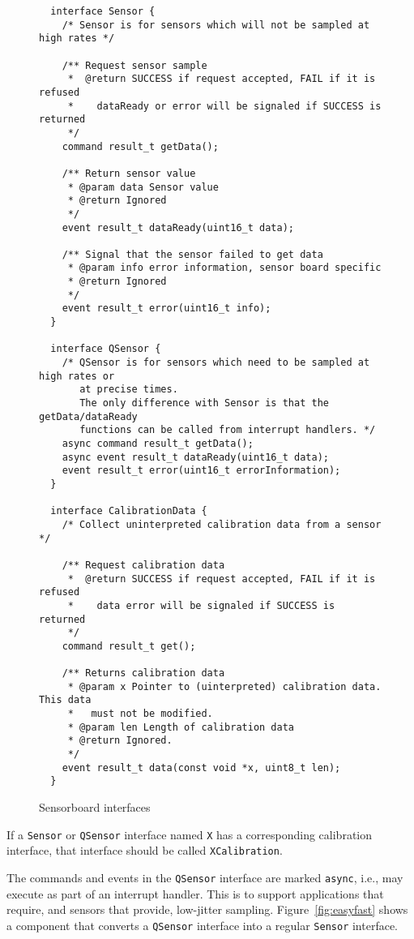 \documentclass{article}
\newcommand{\code}[1]{{\tt #1}}
\begin{document}
\begin{figure}
\begin{verbatim}
  interface Sensor {
    /* Sensor is for sensors which will not be sampled at high rates */

    /** Request sensor sample
     *  @return SUCCESS if request accepted, FAIL if it is refused
     *    dataReady or error will be signaled if SUCCESS is returned
     */
    command result_t getData();

    /** Return sensor value
     * @param data Sensor value
     * @return Ignored
     */
    event result_t dataReady(uint16_t data);

    /** Signal that the sensor failed to get data
     * @param info error information, sensor board specific
     * @return Ignored
     */
    event result_t error(uint16_t info);
  }

  interface QSensor {
    /* QSensor is for sensors which need to be sampled at high rates or
       at precise times.
       The only difference with Sensor is that the getData/dataReady
       functions can be called from interrupt handlers. */
    async command result_t getData();
    async event result_t dataReady(uint16_t data);
    event result_t error(uint16_t errorInformation);
  }

  interface CalibrationData {
    /* Collect uninterpreted calibration data from a sensor */

    /** Request calibration data
     *  @return SUCCESS if request accepted, FAIL if it is refused
     *    data error will be signaled if SUCCESS is returned
     */
    command result_t get();

    /** Returns calibration data
     * @param x Pointer to (uinterpreted) calibration data. This data
     *   must not be modified.
     * @param len Length of calibration data
     * @return Ignored.
     */
    event result_t data(const void *x, uint8_t len);
  }
\end{verbatim}
\caption{Sensorboard interfaces}
\label{fig:interfaces}
\end{figure}

If a \code{Sensor} or \code{QSensor} interface named \code{X} has a
corresponding calibration interface, that interface should be called
\code{XCalibration}.

The commands and events in the \code{QSensor} interface are marked
\code{async}, i.e., may execute as part of an interrupt handler. This is to
support applications that require, and sensors that provide, low-jitter
sampling. Figure~\ref{fig:easyfast} shows a component that converts a
\code{QSensor} interface into a regular \code{Sensor} interface.
\end{document}
